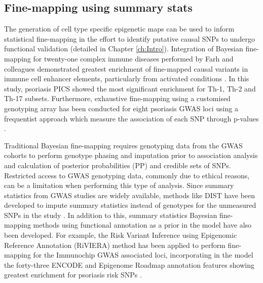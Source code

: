 \subsection{Fine-mapping using summary stats}

The generation of cell type specific epigenetic maps can be used to inform statistical fine-mapping in the effort to identify putative causal SNPs to undergo functional validation (detailed in Chapter \ref{ch:Intro}). Integration of Bayesian fine-mapping for twenty-one complex immune diseases performed by Farh and colleagues demonstrated greatest enrichment of fine-mapped causal variants in immune cell enhancer elements, particularly from activated conditions \parencite{Farh2015}. In this study, psoriasis PICS showed the most significant enrichment for Th-1, Th-2 and Th-17 subsets. Furthermore, exhaustive fine-mapping using a customised genotyping array has been conducted for eight psoriasis GWAS loci using a frequentist approach which measure the association of each SNP through p-values \parencite{Das2014}.

Traditional Bayesian fine-mapping requires genotyping data from the GWAS cohorts to perform genotype phasing and imputation prior to association analysis and calculation of posterior probabilities (PP) and credible sets of SNPs. Restricted access to GWAS genotyping data, commonly due to ethical reasons, can be a limitation when performing this type of analysis. Since summary statistics from GWAS studies are widely available, methods like DIST have been developed to impute summary statistics instead of genotypes for the unmeasured SNPs in the study \parencite{Lee2013}. In addition to this, summary statistics Bayesian fine-mapping methods using functional annotation as a prior in the model have also been developed. For example, the Risk Variant Inference using Epigenomic Reference Annotation (RiVIERA) method has been applied to perform fine-mapping for the Immunochip GWAS associated loci, incorporating in the model the forty-three ENCODE and Epigenome Roadmap annotation features showing greatest enrichment for psoriasis risk SNPs \parencite{Li2016}. 



